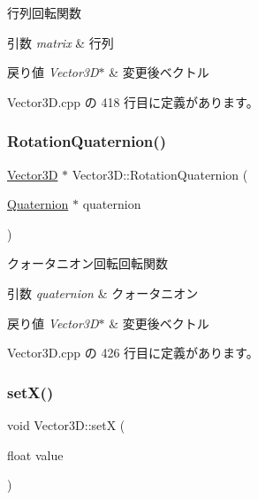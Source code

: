 行列回転関数 


\begin{DoxyParams}{引数}
{\em matrix} & 行列 \\
\hline
\end{DoxyParams}

\begin{DoxyRetVals}{戻り値}
{\em Vector3\+D$\ast$} & 変更後ベクトル \\
\hline
\end{DoxyRetVals}


 Vector3\+D.\+cpp の 418 行目に定義があります。

\mbox{\label{class_vector3_d_ab81a157d73d4a3274c8191834b2bfb45}} 
\subsubsection{\texorpdfstring{Rotation\+Quaternion()}{RotationQuaternion()}}
{\footnotesize\ttfamily \mbox{\hyperlink{class_vector3_d}{Vector3D}} $\ast$ Vector3\+D\+::\+Rotation\+Quaternion (\begin{DoxyParamCaption}\item[{\mbox{\hyperlink{_vector3_d_8h_a3ee38c9c46d9851e33a9a1113328dafc}{Quaternion}} $\ast$}]{quaternion }\end{DoxyParamCaption})}



クォータニオン回転回転関数 


\begin{DoxyParams}{引数}
{\em quaternion} & クォータニオン \\
\hline
\end{DoxyParams}

\begin{DoxyRetVals}{戻り値}
{\em Vector3\+D$\ast$} & 変更後ベクトル \\
\hline
\end{DoxyRetVals}


 Vector3\+D.\+cpp の 426 行目に定義があります。

\mbox{\label{class_vector3_d_a1d0270486894c651e920dfa62dc9259a}} 
\subsubsection{\texorpdfstring{set\+X()}{setX()}}
{\footnotesize\ttfamily void Vector3\+D\+::setX (\begin{DoxyParamCaption}\item[{float}]{value }\end{DoxyParamCaption})}



